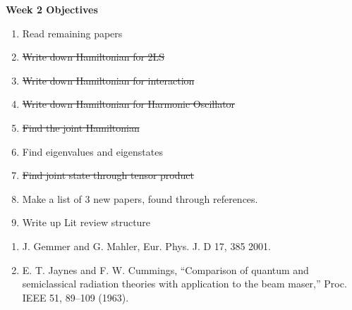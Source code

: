\documentclass{article}
\begin{document}
\Large{\textbf{Week 2 Objectives}}
\\
\begin{enumerate}
    \item Read remaining papers
    \item\sout{Write down Hamiltonian for 2LS}
    \item \sout{Write down Hamiltonian for interaction}
    \item \sout{Write down Hamiltonian for Harmonic Oscillator}
    \item \sout{Find the joint Hamiltonian }
    \item Find eigenvalues and eigenstates
    \item \sout{Find joint state through tensor product}
    \item Make a list of 3 new papers, found through references.
    \item Write up Lit review structure


\end{enumerate}

\small{
\begin{enumerate}
    \item J. Gemmer and G. Mahler, Eur. Phys. J. D 17, 385 2001.
    \item E. T. Jaynes and F. W. Cummings, “Comparison of quantum and semiclassical
radiation theories with application to the beam maser,” Proc.
IEEE 51, 89–109 (1963).
\end{enumerate}}
\end{document}
